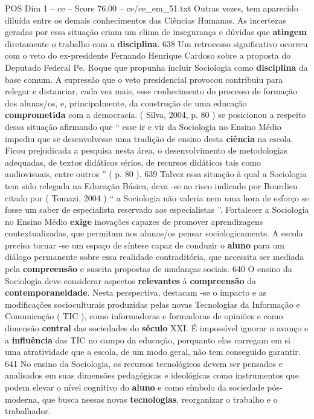 \begin{textsample}{POS Dim 1 – ce – Score 76.00 – ce/ce\_em\_51.txt}
Outras vezes, tem aparecido diluída entre os demais conhecimentos das Ciências Humanas.
As incertezas geradas por essa situação criam um clima de insegurança e dúvidas que \textbf{atingem} diretamente o trabalho com a \textbf{disciplina}. 638 Um retrocesso significativo ocorreu com o veto do ex-presidente Fernando Henrique Cardoso sobre a proposta do Deputado Federal Pe.
Roque que propunha incluir Sociologia como \textbf{disciplina} da base comum.
A supressão que o veto presidencial provocou contribuiu para relegar e distanciar, cada vez mais, esse conhecimento do processo de formação dos alunas/os, e, principalmente, da construção de uma educação \textbf{comprometida} com a democracia. ( Silva, 2004, p. 80 ) se posicionou a respeito dessa situação afirmando que “ esse ir e vir da Sociologia no Ensino Médio impediu que se desenvolvesse uma tradição de ensino desta \textbf{ciência} na escola.
Ficou prejudicada a pesquisa nesta área, o desenvolvimento de metodologias adequadas, de textos didáticos sérios, de recursos didáticos tais como audiovisuais, entre outros ” ( p. 80 ). 639 Talvez essa situação à qual a Sociologia tem sido relegada na Educação Básica, deva -se ao risco indicado por Bourdieu citado por ( Tomazi, 2004 ) “ a Sociologia não valeria nem uma hora de esforço se fosse um saber de especialista reservado aos especialistas ”.
Fortalecer a Sociologia no Ensino Médio \textbf{exige} inovações capazes de promover aprendizagens contextualizadas, que permitam aos alunas/os pensar sociologicamente.
A escola precisa tornar -se um espaço de síntese capaz de conduzir o \textbf{aluno} para um diálogo permanente sobre essa realidade contraditória, que necessita ser mediada pela \textbf{compreensão} e suscita propostas de mudanças sociais. 640 O ensino da Sociologia deve considerar aspectos \textbf{relevantes} à \textbf{compreensão} da \textbf{contemporaneidade}.
Nesta perspectiva, destacam -se o impacto e as modificações socioculturais produzidas pelas novas Tecnologias da Informação e Comunicação ( TIC ), como informadoras e formadoras de opiniões e como dimensão \textbf{central} das sociedades do \textbf{século} XXI.
É impossível ignorar o avanço e a \textbf{influência} das TIC no campo da educação, porquanto elas carregam em si uma atratividade que a escola, de um modo geral, não tem conseguido garantir. 641 No ensino da Sociologia, os recursos tecnológicos devem ser pensados e analisados em suas dimensões pedagógicas e ideológicas como instrumentos que podem elevar o nível cognitivo do \textbf{aluno} e como símbolo da sociedade pós-moderna, que busca nessas novas \textbf{tecnologias}, reorganizar o trabalho e o trabalhador.

\end{textsample}
